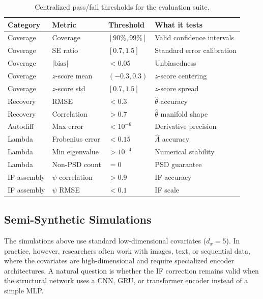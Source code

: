 \begin{table}[ht]
\centering
\caption{Centralized pass/fail thresholds for the evaluation suite.}\label{tab:thresholds}
\begin{tabular}{llll}
\toprule
\textbf{Category} & \textbf{Metric} & \textbf{Threshold} & \textbf{What it tests} \\
\midrule
Coverage    & Coverage          & $[90\%, 99\%]$       & Valid confidence intervals \\
Coverage    & SE ratio          & $[0.7, 1.5]$         & Standard error calibration \\
Coverage    & $|\text{bias}|$   & $< 0.05$             & Unbiasedness \\
Coverage    & $z$-score mean    & $(-0.3, 0.3)$        & $z$-score centering \\
Coverage    & $z$-score std     & $[0.7, 1.5]$         & $z$-score spread \\
\midrule
Recovery    & RMSE              & $< 0.3$              & $\hat{\theta}$ accuracy \\
Recovery    & Correlation       & $> 0.7$              & $\hat{\theta}$ manifold shape \\
\midrule
Autodiff    & Max error         & $< 10^{-6}$          & Derivative precision \\
\midrule
Lambda      & Frobenius error   & $< 0.15$             & $\hat{\Lambda}$ accuracy \\
Lambda      & Min eigenvalue    & $> 10^{-4}$          & Numerical stability \\
Lambda      & Non-PSD count     & $= 0$                & PSD guarantee \\
\midrule
IF assembly & $\psi$ correlation & $> 0.9$             & IF accuracy \\
IF assembly & $\psi$ RMSE       & $< 0.1$             & IF scale \\
\bottomrule
\end{tabular}
\end{table}

\subsection{Semi-Synthetic Simulations}\label{sec:semi_synthetic}

The simulations above use standard low-dimensional covariates ($d_x = 5$). In practice, however, researchers often work with images, text, or sequential data, where the covariates are high-dimensional and require specialized encoder architectures. A natural question is whether the IF correction remains valid when the structural network uses a CNN, GRU, or transformer encoder instead of a simple MLP.

